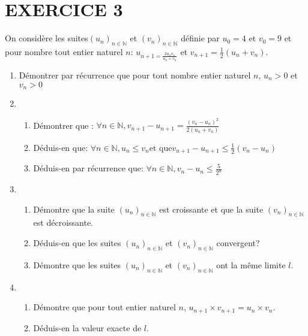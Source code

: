 \documentclass[13pts]{report}
\begin{document}
\section*{EXERCICE 3}
On considère les suites$(u_n)_{n \in \mathbb{N}}$ et $(v_n)_{n \in \mathbb{N}}$ définie par $u_0=4$ et $v_0=9$ et pour nombre tout entier naturel $n$: $u_{n+1=\frac{2u_nv_n}{u_n+v_n}}$ et $v_{n+1}=\frac{1}{2}(u_n+v_n)$.
\begin{enumerate}
	\item Démontrer par récurrence que pour tout nombre entier naturel $n$, $u_n>0$ et $v_n>0$
	\item \begin{enumerate}
				\item Démontrer que : $\forall n \in \mathbb{N}, v_{n+1}-u_{n+1}=\frac{(v_n-u_n)^2}{2(u_n+v_n)}$
				\item Déduis-en que: $\forall n \in \mathbb{N}, u_n\leq v_n \text{et que} v_{n+1}-u_{n+1}\leq \frac{1}{2}(v_n-u_n)$
				\item Déduis-en par récurrence que: $\forall n \in \mathbb{N}, v_n-u_n\leq \frac{5}{2^n}$
	\end{enumerate}
	\item \begin{enumerate}
				\item Démontre que la suite $(u_n)_{n \in \mathbb{N}}$ est croissante et que la suite $(v_n)_{n \in \mathbb{N}}$ est décroissante. 
				\item Déduis-en que les suites $(u_n)_{n \in \mathbb{N}}$ et $(v_n)_{n \in \mathbb{N}}$ convergent?
				\item Démontre que les suites $(u_n)_{n \in \mathbb{N}}$ et $(v_n)_{n \in \mathbb{N}}$ ont la même limite $l$.
		  \end{enumerate}
	  \item \begin{enumerate}
	  			\item Démontre que pour tout entier naturel $n$, $u_{n+1} \times v_{n+1}=u_n \times v_n$.
	  			\item Déduis-en la valeur exacte de $l$.
	  		\end{enumerate}
\end{enumerate} 

\end{document}
